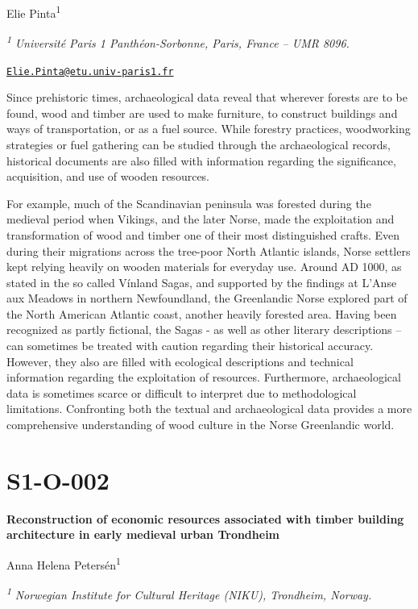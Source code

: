 \documentclass[
]{book}
\begin{document}
Elie Pinta\textsuperscript{1}

\textsuperscript{\emph{1}} \emph{Université Paris 1 Panthéon-Sorbonne, Paris, France -- UMR 8096.}

\href{mailto:Elie.Pinta@etu.univ-paris1.fr}{\nolinkurl{Elie.Pinta@etu.univ-paris1.fr}}

Since prehistoric times, archaeological data reveal that wherever forests are to be found, wood and timber are used to make furniture, to construct buildings and ways of transportation, or as a fuel source. While forestry practices, woodworking strategies or fuel gathering can be studied through the archaeological records, historical documents are also filled with information regarding the significance, acquisition, and use of wooden resources.

For example, much of the Scandinavian peninsula was forested during the medieval period when Vikings, and the later Norse, made the exploitation and transformation of wood and timber one of their most distinguished crafts. Even during their migrations across the tree-poor North Atlantic islands, Norse settlers kept relying heavily on wooden materials for everyday use. Around AD 1000, as stated in the so called Vínland Sagas, and supported by the findings at L'Anse aux Meadows in northern Newfoundland, the Greenlandic Norse explored part of the North American Atlantic coast, another heavily forested area. Having been recognized as partly fictional, the Sagas - as well as other literary descriptions -- can sometimes be treated with caution regarding their historical accuracy. However, they also are filled with ecological descriptions and technical information regarding the exploitation of resources. Furthermore, archaeological data is sometimes scarce or difficult to interpret due to methodological limitations. Confronting both the textual and archaeological data provides a more comprehensive understanding of wood culture in the Norse Greenlandic world.

\hypertarget{s1-o-002}{%
\section*{S1-O-002}\label{s1-o-002}}

\textbf{Reconstruction of economic resources associated with timber building architecture in early medieval urban Trondheim}

Anna Helena Petersén\textsuperscript{1}

\textsuperscript{\emph{1}} \emph{Norwegian Institute for Cultural Heritage (NIKU), Trondheim, Norway.}
\end{document}
